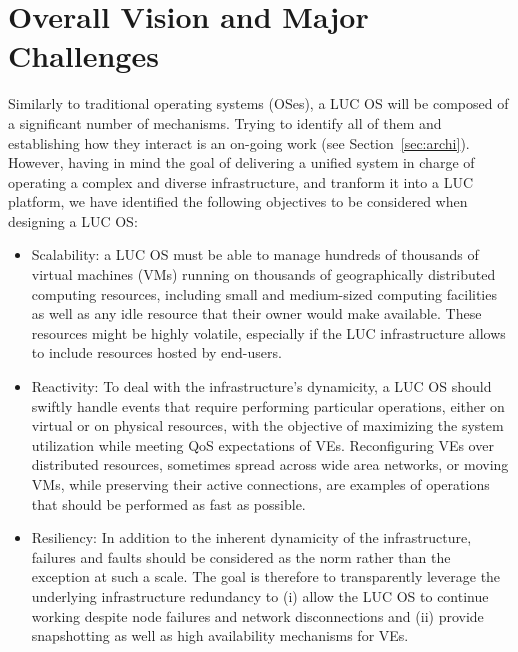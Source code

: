 \section{Overall Vision and Major Challenges\label{sec:challenges}}

Similarly to traditional operating systems (OSes), a LUC OS will be composed of a
significant number of mechanisms. Trying to identify all of them and establishing how they
interact is an on-going work (see Section~\ref{sec:archi}). However, having in
mind the goal of delivering a unified system in charge of operating a complex and diverse
infrastructure, and tranform it into a LUC platform, we have identified the following
objectives to be considered when designing a LUC OS:

\begin{itemize} 
\item Scalability: a LUC OS must be able to manage hundreds of
  thousands of virtual machines (VMs) running on thousands of 
  geographically distributed computing resources, including small and
  medium-sized computing facilities as well as any idle resource that their owner would make available. These resources might be
  highly volatile, especially if the LUC infrastructure allows to include resources hosted by
  end-users.
\item Reactivity: To deal with the infrastructure's dynamicity, a LUC OS
  should swiftly handle events that require performing particular
  operations, either on virtual or on physical resources, with the
  objective of maximizing the system utilization while meeting QoS expectations of VEs. 
  Reconfiguring  VEs over distributed resources, sometimes spread across wide area networks, or moving VMs, 
  while preserving their active connections, are examples of operations that should be performed as fast as possible.
\item Resiliency: In addition to the inherent dynamicity of the
  infrastructure, failures and faults should be considered as the norm rather than the
exception at such a scale. The goal is therefore to transparently leverage the
underlying infrastructure redundancy to (i) allow the LUC OS to continue
working despite node failures and network disconnections and (ii) provide
snapshotting as well as high availability mechanisms for VEs.



\end{itemize}
